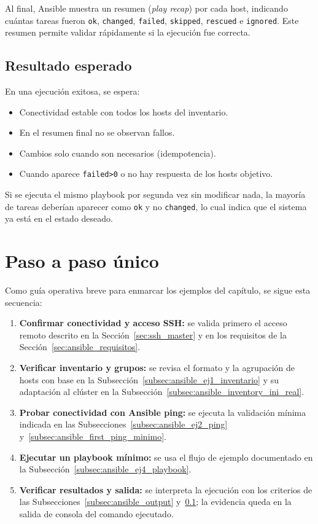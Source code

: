 Al final, Ansible muestra un resumen (\textit{play recap}) por cada host, indicando cuántas tareas fueron \texttt{ok}, \texttt{changed}, \texttt{failed}, \texttt{skipped}, \texttt{rescued} e \texttt{ignored}. Este resumen permite validar rápidamente si la ejecución fue correcta.

\subsection{Resultado esperado}
\label{subsec:ansible_expected_results}

En una ejecución exitosa, se espera:
\begin{itemize}
  \item \inlineok Conectividad estable con todos los hosts del inventario.
  \item \inlineok[OK: failed=0] En el resumen final no se observan fallos.
  \item \inlineok Cambios solo cuando son necesarios (idempotencia).
  \item \inlinefail Cuando aparece \texttt{failed>0} o no hay respuesta de los hosts objetivo.
\end{itemize}

Si se ejecuta el mismo playbook por segunda vez sin modificar nada, la mayoría de tareas deberían aparecer como \texttt{ok} y no \texttt{changed}, lo cual indica que el sistema ya está en el estado deseado.

\section{Paso a paso único}
\label{subsec:ansible_paso_a_paso_unico}

Como guía operativa breve para enmarcar los ejemplos del capítulo, se sigue esta secuencia:
\begin{enumerate}
  \item \textbf{Confirmar conectividad y acceso SSH:} se valida primero el acceso remoto descrito en la Sección~\ref{sec:ssh_master} y en los requisitos de la Sección~\ref{sec:ansible_requisitos}.
  \item \textbf{Verificar inventario y grupos:} se revisa el formato y la agrupación de hosts con base en la Subsección~\ref{subsec:ansible_ej1_inventario} y su adaptación al clúster en la Subsección~\ref{subsec:ansible_inventory_ini_real}.
  \item \textbf{Probar conectividad con Ansible ping:} se ejecuta la validación mínima indicada en las Subsecciones~\ref{subsec:ansible_ej2_ping} y~\ref{subsec:ansible_first_ping_minimo}.
  \item \textbf{Ejecutar un playbook mínimo:} se usa el flujo de ejemplo documentado en la Subsección~\ref{subsec:ansible_ej4_playbook}.
  \item \textbf{Verificar resultados y salida:} se interpreta la ejecución con los criterios de las Subsecciones~\ref{subsec:ansible_output} y~\ref{subsec:ansible_expected_results}; la evidencia queda en la salida de consola del comando ejecutado.
\end{enumerate}

